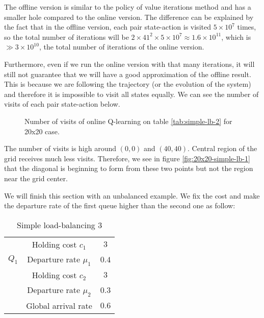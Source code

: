 \documentclass[
  a4paper, xcolor = usenames,dvipsnames]{article}
\theoremstyle{definition}
\theoremstyle{definition}
\theoremstyle{definition}
\theoremstyle{definition}
\theoremstyle{remark}
\begin{document}
The offline version is similar to the policy of value iterations method and has a smaller hole compared to the online version. The difference can be explained by the fact that in the offline version, each pair state-action is visited \(5 \times 10^{7}\) times, so the total number of iterations will be \(2 \times 41^{2} \times 5 \times 10^{7} \approx 1.6 \times 10^{11}\), which is \(\gg 3 \times 10^{10}\), the total number of iterations of the online version.

Furthermore, even if we run the online version with that many iterations, it will still not guarantee that we will have a good approximation of the offline result. This is because we are following the trajectory (or the evolution of the system) and therefore it is impossible to visit all states equally. We can see the number of visits of each pair state-action below.



\begin{figure}

{\centering {}

}

\caption{Number of visits of online Q-learning on table \ref{tab:simple-lb-2} for 20x20 case.}\label{fig:20x20-simple-lb-2-n-visit}
\end{figure}

The number of visits is high around \((0, 0)\) and \((40, 40)\). Central region of the grid receives much less visits. Therefore, we see in figure \ref{fig:20x20-simple-lb-1} that the diagonal is beginning to form from these two points but not the region near the grid center.

We will finish this section with an unbalanced example. We fix the cost and make the departure rate of the first queue higher than the second one as follow:

\begin{table}[!htbp]
\caption{Simple load-balancing 3}
\begin{center}
\begin{tabular}{c c c}
    \hline
    \multirow{3}{*}{$Q_{1}$} & Holding cost $c_{1}$ & $3$ \\
    & Departure rate $\mu_{1}$ & $0.4$ \\
    \cline{2-3}
    \multirow{3}{*}{$Q_{2}$} & Holding cost $c_{2}$ & $3$ \\
    & Departure rate $\mu_{2}$ & $0.3$ \\
    \cline{2-3}
    & Global arrival rate & $0.6$ \\    
    \hline
\end{tabular}
\end{center}
\label{tab:simple-lb-3}
\end{table}
\end{document}
